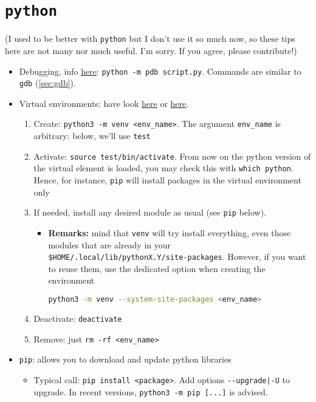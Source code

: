 \documentclass[a4paper,12pt,%
              final%
              ]{article}
\begin{document}
\section{\texttt{python}}
\label{sec:python}
(I used to be better with \texttt{python} but I don't use it so much now, so these tips here are not many nor much useful. I'm sorry. If you agree, please contribute!)
\begin{itemize}
  \item Debugging, info \href{https://docs.python.org/2/library/pdb.html}{here}: \texttt{python -m pdb script.py}. Commands are similar to \texttt{gdb} (\ref{sec:gdb}).
  \item Virtual environments: have look \href{https://packaging.python.org/guides/installing-using-pip-and-virtual-environments/}{here} or \href{https://docs.python.org/3/tutorial/venv.html}{here}.
    \begin{enumerate}
      \item Create: \verb|python3 -m venv <env_name>|. The argument \verb|env_name| is arbitrary: below, we'll use \verb|test|
      \item Activate: \verb|source test/bin/activate|. From now on the python version of the virtual element is loaded, you may check this with \verb|which python|. Hence, for instance, \verb|pip| will install packages in the virtual environment only
      \item If needed, install any desired module as usual (see \texttt{pip} below).
        \begin{itemize}
          \item \textbf{Remarks:} mind that \texttt{venv} will try install everything, even those modules that are already in your \verb|$HOME/.local/lib/pythonX.Y/site-packages|.
            However, if you want to reuse them, use the dedicated option when creating the environment
\begin{lstlisting}[language=bash]
python3 -m venv --system-site-packages <env_name>
\end{lstlisting}
        \end{itemize}
      \item Deactivate: \verb|deactivate|
      \item Remove: just \verb|rm -rf <env_name>|
    \end{enumerate}
  \item \texttt{pip}: allows you to download and update python libraries
    \begin{itemize}
      \item Typical call: \verb|pip install <package>|. Add options \verb!--upgrade|-U! to upgrade. In recent versions, \verb|python3 -m pip [...]| is advised.

\end{itemize}
\end{itemize}
\end{document}
